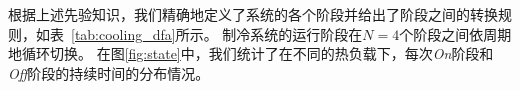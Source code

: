 根据上述先验知识，我们精确地定义了系统的各个阶段并给出了阶段之间的转换规则，如表~\ref{tab:cooling_dfa}所示。
制冷系统的运行阶段在$N=4$个阶段之间依周期地循环切换。
在图\ref{fig:state}中，我们统计了在不同的热负载下，每次\textit{On}阶段和\textit{Off}阶段的持续时间的分布情况。
